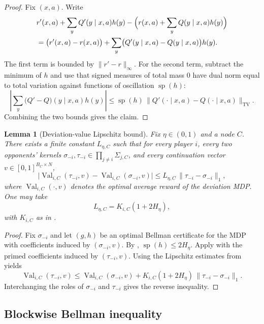 \documentclass[12pt]{article}
\newtheorem{lemma}[theorem]{Lemma}
\theoremstyle{definition}
\newcommand{\1}{\mathbf{1}}
\DeclareMathOperator{\spn}{sp}
\begin{document}
\begin{proof}
Fix $(x,a)$. Write
\begin{align*}
&r'(x,a)+\sum_y Q'(y\mid x,a)h(y)
-
\Bigl(r(x,a)+\sum_y Q(y\mid x,a)h(y)\Bigr)
\\
&= \bigl(r'(x,a)-r(x,a)\bigr)
+
\sum_y\bigl(Q'(y\mid x,a)-Q(y\mid x,a)\bigr)h(y).
\end{align*}
The first term is bounded by $\|r'-r\|_\infty$. For the second term, subtract the
minimum of $h$ and use that signed measures of total mass $0$ have dual norm equal
to total variation against functions of oscillation $\spn(h)$:
\[
\left|\sum_y\bigl(Q'-Q\bigr)(y\mid x,a)h(y)\right|
\le
\spn(h)\,\|Q'(\cdot\mid x,a)-Q(\cdot\mid x,a)\|_{\mathrm{TV}}.
\]
Combining the two bounds gives the claim.
\end{proof}

\begin{lemma}[Deviation-value Lipschitz bound]
\label{lem:deviation-lipschitz}
Fix $\eta\in(0,1)$ and a node $C$. There exists a finite constant $L_{\eta,C}$
such that for every player $i$, every two opponents' kernels
$\sigma_{-i},\tau_{-i}\in\prod_{j\ne i}\Sigma_{j,C}$, and every continuation vector
$v\in[0,1]^{B_C\times N}$,
\[
\bigl|\operatorname{Val}_{i,C}(\tau_{-i},v)-\operatorname{Val}_{i,C}(\sigma_{-i},v)\bigr|
\le L_{\eta,C}\,\|\tau_{-i}-\sigma_{-i}\|_1,
\]
where $\operatorname{Val}_{i,C}(\cdot,v)$ denotes the optimal average reward of the
deviation MDP. One may take
\[
L_{\eta,C}=K_{i,C}(1+2H_\eta),
\]
with $K_{i,C}$ as in .
\end{lemma}

\begin{proof}
Fix $\sigma_{-i}$ and let $(g,h)$ be an optimal Bellman certificate for the MDP with
coefficients induced by $(\sigma_{-i},v)$. By ,
$\spn(h)\le 2H_\eta$. Apply  with the primed
coefficients induced by $(\tau_{-i},v)$. Using the Lipschitz estimates from
 yields
\[
\operatorname{Val}_{i,C}(\tau_{-i},v)
\le
\operatorname{Val}_{i,C}(\sigma_{-i},v)
+
K_{i,C}(1+2H_\eta)\,\|\tau_{-i}-\sigma_{-i}\|_1.
\]
Interchanging the roles of $\sigma_{-i}$ and $\tau_{-i}$ gives the reverse
inequality.
\end{proof}

\subsection{Blockwise Bellman inequality}
\end{document}
